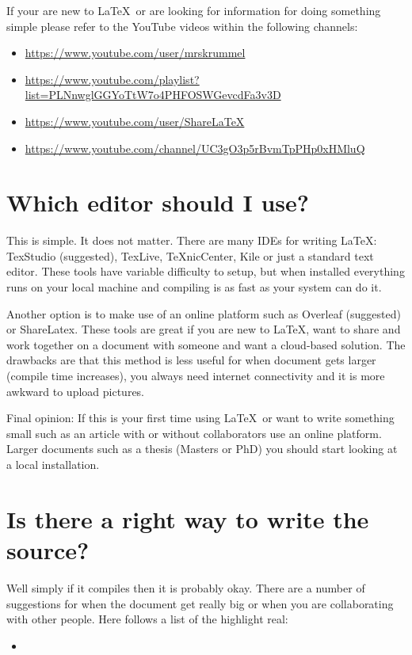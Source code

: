 \documentclass[12pt]{article}
\begin{document}
If your are new to \LaTeX~or are looking for information for doing something simple please refer to the YouTube videos within the following channels:
\begin{itemize}
	\item \url{https://www.youtube.com/user/mrskrummel}
	\item \url{https://www.youtube.com/playlist?list=PLNnwglGGYoTtW7o4PHFOSWGevcdFa3v3D}
	\item \url{https://www.youtube.com/user/ShareLaTeX}
	\item \url{https://www.youtube.com/channel/UC3gO3p5rBvmTpPHp0xHMluQ}
\end{itemize}

\section*{Which editor should I use?}
This is simple.
It does not matter.
There are many IDEs for writing \LaTeX: TexStudio (suggested), TexLive, TeXnicCenter, Kile or just a standard text editor.
These tools have variable difficulty to setup, but when installed everything runs on your local machine and compiling is as fast as your system can do it.

Another option is to make use of an online platform such as Overleaf (suggested) or ShareLatex.
These tools are great if you are new to \LaTeX, want to share and work together on a document with someone and want a cloud-based solution.
The drawbacks are that this method is less useful for when document gets larger (compile time increases), you always need internet connectivity and it is more awkward to upload pictures.

Final opinion:  If this is your first time using \LaTeX~or want to write something small such as an article with or without collaborators use an online platform.
Larger documents such as a thesis (Masters or PhD) you should start looking at a local installation.

\section*{Is there a right way to write the source?}
Well simply if it compiles then it is probably okay.
There are a number of suggestions for when the document get really big or when you are collaborating with other people.
Here follows a list of the highlight real:
\begin{itemize}
	\item 
\end{itemize}
\end{document}
